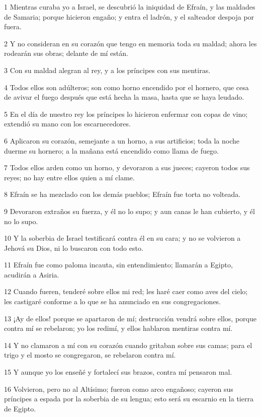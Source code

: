 \par 1 Mientras curaba yo a Israel, se descubrió la iniquidad de Efraín, y las maldades de Samaria; porque hicieron engaño; y entra el ladrón, y el salteador despoja por fuera.
\par 2 Y no consideran en su corazón que tengo en memoria toda su maldad; ahora les rodearán sus obras; delante de mí están.
\par 3 Con su maldad alegran al rey, y a los príncipes con sus mentiras.
\par 4 Todos ellos son adúlteros; son como horno encendido por el hornero, que cesa de avivar el fuego después que está hecha la masa, hasta que se haya leudado.
\par 5 En el día de nuestro rey los príncipes lo hicieron enfermar con copas de vino; extendió su mano con los escarnecedores.
\par 6 Aplicaron su corazón, semejante a un horno, a sus artificios; toda la noche duerme su hornero; a la mañana está encendido como llama de fuego.
\par 7 Todos ellos arden como un horno, y devoraron a sus jueces; cayeron todos sus reyes; no hay entre ellos quien a mí clame.
\par 8 Efraín se ha mezclado con los demás pueblos; Efraín fue torta no volteada.
\par 9 Devoraron extraños su fuerza, y él no lo supo; y aun canas le han cubierto, y él no lo supo.
\par 10 Y la soberbia de Israel testificará contra él en su cara; y no se volvieron a Jehová su Dios, ni lo buscaron con todo esto.
\par 11 Efraín fue como paloma incauta, sin entendimiento; llamarán a Egipto, acudirán a Asiria.
\par 12 Cuando fueren, tenderé sobre ellos mi red; les haré caer como aves del cielo; les castigaré conforme a lo que se ha anunciado en sus congregaciones.
\par 13 ¡Ay de ellos! porque se apartaron de mí; destrucción vendrá sobre ellos, porque contra mí se rebelaron; yo los redimí, y ellos hablaron mentiras contra mí.
\par 14 Y no clamaron a mí con su corazón cuando gritaban sobre sus camas; para el trigo y el mosto se congregaron, se rebelaron contra mí.
\par 15 Y aunque yo los enseñé y fortalecí sus brazos, contra mí pensaron mal.
\par 16 Volvieron, pero no al Altísimo; fueron como arco engañoso; cayeron sus príncipes a espada por la soberbia de su lengua; esto será su escarnio en la tierra de Egipto.


